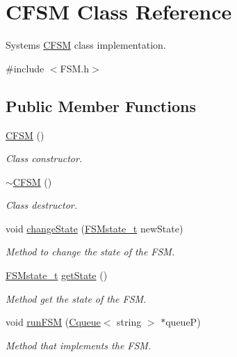 \hypertarget{class_c_f_s_m}{}\section{C\+F\+SM Class Reference}
\label{class_c_f_s_m}


System\textquotesingle{}s \mbox{\hyperlink{class_c_f_s_m}{C\+F\+SM}} class implementation.  




{\ttfamily \#include $<$F\+S\+M.\+h$>$}

\subsection*{Public Member Functions}
\begin{DoxyCompactItemize}
\item 
\mbox{\label{class_c_f_s_m_a84a43705322f53414f0f7fceeb9b26c6}} 
\mbox{\hyperlink{class_c_f_s_m_a84a43705322f53414f0f7fceeb9b26c6}{C\+F\+SM}} ()
\begin{DoxyCompactList}\small\item\em Class constructor. \end{DoxyCompactList}\item 
\mbox{\label{class_c_f_s_m_a99c583f74a419101fe47dda8ad7423c7}} 
\mbox{\hyperlink{class_c_f_s_m_a99c583f74a419101fe47dda8ad7423c7}{$\sim$\+C\+F\+SM}} ()
\begin{DoxyCompactList}\small\item\em Class destructor. \end{DoxyCompactList}\item 
void \mbox{\hyperlink{class_c_f_s_m_afce29c93915785baa519eb824efc938b}{change\+State}} (\mbox{\hyperlink{_f_s_m_8h_a7d59fd39d0fd81e92c4d689f0f6e1fab}{F\+S\+Mstate\+\_\+t}} new\+State)
\begin{DoxyCompactList}\small\item\em Method to change the state of the F\+SM. \end{DoxyCompactList}\item 
\mbox{\hyperlink{_f_s_m_8h_a7d59fd39d0fd81e92c4d689f0f6e1fab}{F\+S\+Mstate\+\_\+t}} \mbox{\hyperlink{class_c_f_s_m_a596ebe7fc03a0d1402fefc650f6c1777}{get\+State}} ()
\begin{DoxyCompactList}\small\item\em Method get the state of the F\+SM. \end{DoxyCompactList}\item 
void \mbox{\hyperlink{class_c_f_s_m_a5e7a63354d1088160e3d790bebb099af}{run\+F\+SM}} (\mbox{\hyperlink{class_cqueue}{Cqueue}}$<$ string $>$ $\ast$queueP)
\begin{DoxyCompactList}\small\item\em Method that implements the F\+SM. \end{DoxyCompactList}\end{DoxyCompactItemize}


